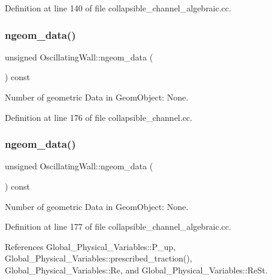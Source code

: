 Definition at line 140 of file collapsible\+\_\+channel\+\_\+algebraic.\+cc.

\mbox{\label{classOscillatingWall_ae3fa3ef50ef7e082b255ba8125373581}} 
\subsubsection{\texorpdfstring{ngeom\+\_\+data()}{ngeom\_data()}\hspace{0.1cm}{\footnotesize\ttfamily [1/2]}}
{\footnotesize\ttfamily unsigned Oscillating\+Wall\+::ngeom\+\_\+data (\begin{DoxyParamCaption}{ }\end{DoxyParamCaption}) const\hspace{0.3cm}{\ttfamily [inline]}}



Number of geometric Data in Geom\+Object\+: None. 



Definition at line 176 of file collapsible\+\_\+channel.\+cc.

\mbox{\label{classOscillatingWall_ae3fa3ef50ef7e082b255ba8125373581}} 
\subsubsection{\texorpdfstring{ngeom\+\_\+data()}{ngeom\_data()}\hspace{0.1cm}{\footnotesize\ttfamily [2/2]}}
{\footnotesize\ttfamily unsigned Oscillating\+Wall\+::ngeom\+\_\+data (\begin{DoxyParamCaption}{ }\end{DoxyParamCaption}) const\hspace{0.3cm}{\ttfamily [inline]}}



Number of geometric Data in Geom\+Object\+: None. 



Definition at line 177 of file collapsible\+\_\+channel\+\_\+algebraic.\+cc.



References Global\+\_\+\+Physical\+\_\+\+Variables\+::\+P\+\_\+up, Global\+\_\+\+Physical\+\_\+\+Variables\+::prescribed\+\_\+traction(), Global\+\_\+\+Physical\+\_\+\+Variables\+::\+Re, and Global\+\_\+\+Physical\+\_\+\+Variables\+::\+Re\+St.

